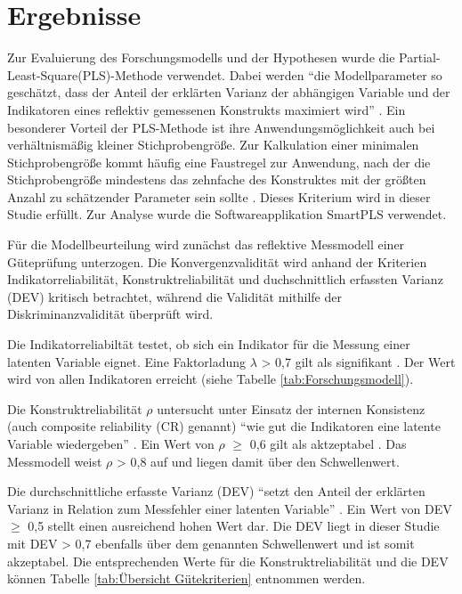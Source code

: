 \section{Ergebnisse}
\label{sec:ergebnisse}
\nocite{lohmoller2013latent}
Zur Evaluierung des Forschungsmodells und der Hypothesen wurde die Partial-Least-Square(PLS)-Methode verwendet. Dabei werden "`die Modellparameter so geschätzt, dass der Anteil der erklärten Varianz der abhängigen Variable und der Indikatoren eines reflektiv gemessenen Konstrukts maximiert wird"' \parencite[S.16]{nitzl2010anwenderorientierte}. Ein besonderer Vorteil der PLS-Methode ist ihre Anwendungsmöglichkeit auch bei verhältnismäßig kleiner Stichprobengröße. Zur Kalkulation einer minimalen Stichprobengröße kommt häufig eine Faustregel zur Anwendung, nach der die Stichprobengröße mindestens das zehnfache des Konstruktes mit der größten Anzahl zu schätzender Parameter sein sollte \parencite[vgl.][S.394]{islam2013investigating}. Dieses Kriterium wird in dieser Studie erfüllt. Zur Analyse wurde die Softwareapplikation SmartPLS verwendet. 

Für die Modellbeurteilung wird zunächst das reflektive Messmodell einer Güteprüfung unterzogen. Die Konvergenzvalidität wird anhand der Kriterien Indikatorreliabilität, Konstruktreliabilität und duchschnittlich erfassten Varianz (DEV) kritisch betrachtet, während die Validität mithilfe der Diskriminanzvalidität überprüft wird.

Die Indikatorreliabiltät testet, ob sich ein Indikator für die Messung einer latenten Variable eignet. Eine Faktorladung $\lambda$ > 0,7 gilt als signifikant \parencite[vgl.][S.24]{nitzl2010anwenderorientierte}. Der Wert wird von allen Indikatoren erreicht (siehe Tabelle \ref{tab:Forschungsmodell}). 

Die Konstruktreliabilität $\rho$ untersucht unter Einsatz der internen Konsistenz (auch composite reliability (CR) genannt) "`wie gut die Indikatoren eine latente Variable wiedergeben"' \parencite[S.25]{nitzl2010anwenderorientierte}. Ein Wert von $\rho$ $\geq$ 0,6 gilt als aktzeptabel \parencite[vgl.][S.212]{ringle2007beurteilung}. Das Messmodell weist $\rho$ > 0,8 auf und liegen damit über den Schwellenwert.  

Die durchschnittliche erfasste Varianz (DEV) "`setzt den Anteil der erklärten Varianz in Relation zum Messfehler einer latenten Variable"'  \parencite[S.25]{nitzl2010anwenderorientierte}. Ein Wert von DEV $\geq$ 0,5 stellt einen ausreichend hohen Wert dar. Die DEV liegt in dieser Studie mit DEV > 0,7 ebenfalls über dem genannten Schwellenwert und ist somit akzeptabel. Die entsprechenden Werte für die Konstruktreliabilität und die DEV können Tabelle \ref{tab:Übersicht Gütekriterien} entnommen werden.


